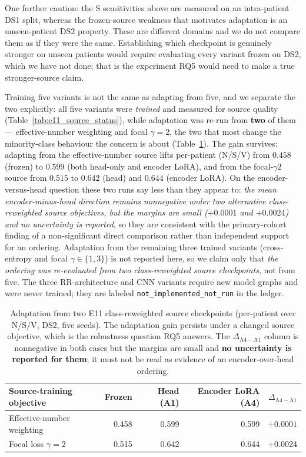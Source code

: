 One further caution: the S sensitivities above are measured on an intra-patient
DS1 split, whereas the frozen-source weakness that motivates adaptation is an
unseen-patient DS2 property. These are different domains and we do not compare
them as if they were the same. Establishing which checkpoint is genuinely
stronger on unseen patients would require evaluating every variant frozen on DS2,
which we have not done; that is the experiment RQ5 would need to make a true
stronger-source claim.

Training five variants is not the same as adapting from five, and we separate
the two explicitly: all five variants were \emph{trained} and measured for source
quality (Table~\ref{tab:e11_source_status}), while adaptation was re-run from
\textbf{two} of them --- effective-number weighting and focal $\gamma{=}2$, the
two that most change the minority-class behaviour the concern is about
(Table~\ref{tab:strong_adapt}). The gain survives: adapting from the
effective-number source lifts per-patient \macrof{} (N/S/V) from $0.458$ (frozen)
to $0.599$ (both head-only and encoder LoRA), and from the focal-$\gamma{2}$
source from $0.515$ to $0.642$ (head) and $0.644$ (encoder LoRA). On the
encoder-versus-head question these two runs say less than they appear to:
\emph{the mean encoder-minus-head direction remains nonnegative under two
alternative class-reweighted source objectives, but the margins are small
($+0.0001$ and $+0.0024$) and no uncertainty is reported}, so they are
consistent with the primary-cohort finding of a non-significant direct
comparison rather than independent support for an ordering.
Adaptation from the remaining three trained
variants (cross-entropy and focal $\gamma \in \{1,3\}$) is not reported here, so
we claim only that \emph{the ordering was re-evaluated from two
class-reweighted source checkpoints}, not from five. The three RR-architecture
and CNN variants require new model graphs and were never trained; they are
labeled \texttt{not\_implemented\_not\_run} in the ledger.



\begin{table}[H]
\centering
\small
\caption{Adaptation from two E11 class-reweighted source checkpoints
(per-patient \macrof{} over N/S/V, DS2, five seeds). The adaptation gain persists
under a changed source objective, which is the robustness question RQ5 answers.
The $\Delta_{\mathrm{A4-A1}}$ column is nonnegative in both cases but the margins
are small and \textbf{no uncertainty is reported for them}; it must not be read
as evidence of an encoder-over-head ordering.}
\label{tab:strong_adapt}
\begin{tabular}{lrrrr}
\toprule
Source-training objective & Frozen & Head (A1) & Encoder LoRA (A4) & $\Delta_{\mathrm{A4-A1}}$ \\
\midrule
Effective-number weighting & 0.458 & 0.599 & 0.599 & $+0.0001$ \\
Focal loss $\gamma=2$       & 0.515 & 0.642 & 0.644 & $+0.0024$ \\
\bottomrule
\end{tabular}
\end{table}


